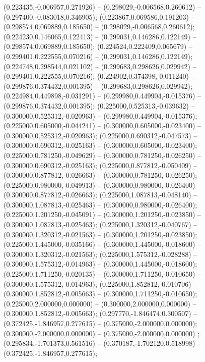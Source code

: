  (0.223435,-0.006957,0.271926) -- (0.298029,-0.006568,0.260612) -- (0.297400,-0.083018,0.346905);
 (0.223867,0.069586,0.191203) -- (0.298574,0.069889,0.185650) -- (0.298029,-0.006568,0.260612);
 (0.224230,0.146065,0.122413) -- (0.299031,0.146286,0.122149) -- (0.298574,0.069889,0.185650);
 (0.224524,0.222409,0.065679) -- (0.299401,0.222555,0.070216) -- (0.299031,0.146286,0.122149);
 (0.224748,0.298544,0.021102) -- (0.299683,0.298626,0.029942) -- (0.299401,0.222555,0.070216);
 (0.224902,0.374398,-0.011240) -- (0.299876,0.374432,0.001395) -- (0.299683,0.298626,0.029942);
 (0.224984,0.449898,-0.031291) -- (0.299980,0.449904,-0.015376) -- (0.299876,0.374432,0.001395);
 (0.225000,0.525313,-0.039632) -- (0.300000,0.525312,-0.020963) -- (0.299980,0.449904,-0.015376);
 (0.225000,0.605000,-0.044241) -- (0.300000,0.605000,-0.023400) -- (0.300000,0.525312,-0.020963);
 (0.225000,0.690312,-0.047573) -- (0.300000,0.690312,-0.025163) -- (0.300000,0.605000,-0.023400);
 (0.225000,0.781250,-0.049629) -- (0.300000,0.781250,-0.026250) -- (0.300000,0.690312,-0.025163);
 (0.225000,0.877812,-0.050409) -- (0.300000,0.877812,-0.026663) -- (0.300000,0.781250,-0.026250);
 (0.225000,0.980000,-0.049913) -- (0.300000,0.980000,-0.026400) -- (0.300000,0.877812,-0.026663);
 (0.225000,1.087813,-0.048140) -- (0.300000,1.087813,-0.025463) -- (0.300000,0.980000,-0.026400);
 (0.225000,1.201250,-0.045091) -- (0.300000,1.201250,-0.023850) -- (0.300000,1.087813,-0.025463);
 (0.225000,1.320312,-0.040767) -- (0.300000,1.320312,-0.021563) -- (0.300000,1.201250,-0.023850);
 (0.225000,1.445000,-0.035166) -- (0.300000,1.445000,-0.018600) -- (0.300000,1.320312,-0.021563);
 (0.225000,1.575312,-0.028288) -- (0.300000,1.575312,-0.014963) -- (0.300000,1.445000,-0.018600);
 (0.225000,1.711250,-0.020135) -- (0.300000,1.711250,-0.010650) -- (0.300000,1.575312,-0.014963);
 (0.225000,1.852812,-0.010706) -- (0.300000,1.852812,-0.005663) -- (0.300000,1.711250,-0.010650);
 (0.225000,2.000000,0.000000) -- (0.300000,2.000000,0.000000) -- (0.300000,1.852812,-0.005663);
 (0.297770,-1.846474,0.300507) -- (0.372425,-1.846957,0.277615) -- (0.375000,-2.000000,0.000000);
 (0.300000,-2.000000,0.000000) -- (0.375000,-2.000000,0.000000) ;
 (0.295834,-1.701373,0.561516) -- (0.370187,-1.702120,0.518998) -- (0.372425,-1.846957,0.277615);
